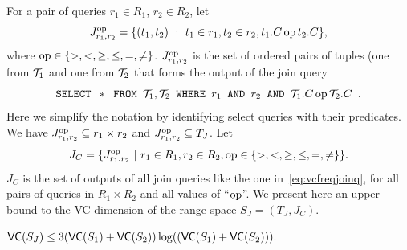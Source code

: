 For a pair of queries $r_1\in R_1$, $r_2\in R_2$, let
\[
J^{\operatorname{op}}_{r_1,r_2}=\{(t_1,t_2) ~:~ t_1\in
r_1, t_2\in r_2, t_1.C \operatorname{op} t_2.C\},\]
where $\operatorname{op}\in\{>,<,\ge,\le,=,\neq\}$. $J^{\operatorname{op}}_{r_1,r_2}$ is the set of ordered pairs of
tuples (one from ${\cal T}_1$ and one from ${\cal T}_2$ that forms the output of the
join query 
\begin{equation}\label{eq:vcfreqjoinq}
\mbox{\texttt{SELECT }} *\mbox{\texttt{ FROM }} {\cal T}_1,{\cal T}_2 \mbox{\texttt{
WHERE }} r_1 \mbox{\texttt{ AND }} r_2 \mbox{\texttt{ AND }} {\cal T}_1.C \operatorname{op}
{\cal T}_2.C\enspace.
\end{equation}
Here we simplify the notation by identifying select queries with
their predicates. We have $J^{\operatorname{op}}_{r_1,r_2}\subseteq
r_1\times r_2$ and $J^{\operatorname{op}}_{r_1,r_2}\subseteq T_J$. Let 
\[ J_C =\{J^{\operatorname{op}}_{r_1,r_2}~|~r_1\in R_1, r_2\in R_2, \operatorname{op}\in\{>,<,\ge,\le,=,\neq\}
\}.\]
$J_C$ is the set of outputs of all join queries like the one in~\eqref{eq:vcfreqjoinq},
for all pairs of queries in $R_1\times R_2$ and all values of ``$\operatorname{op}$''. We
present here an upper bound to the VC-dimension of the range space
$S_J=(T_J,J_C)$.

\begin{lemma}\label{lem:vcdimjoin}
  $\mathsf{VC}(S_J)\leq 3(\mathsf{VC}(S_1)+\mathsf{VC}(S_2))\log ((\mathsf{VC}(S_1)+\mathsf{VC}(S_2))).$
\end{lemma}


